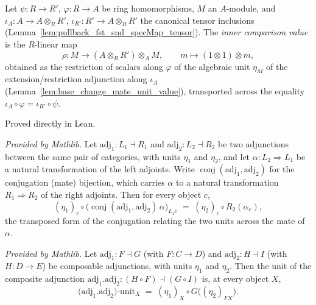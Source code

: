 \begin{definition}

  \label{def:base_change_mate_inner_value}
  Let \(\psi : R \to R'\), \(\varphi : R \to A\) be ring homomorphisms, \(M\) an
  \(A\)-module, and \(\iota_A : A \to A \otimes_R R'\), \(\iota_{R'} : R' \to A \otimes_R R'\)
  the canonical tensor inclusions (Lemma~\ref{lem:pullback_fst_snd_specMap_tensor}).
  The \emph{inner comparison value} is the \(R\)-linear map
  \[
    \rho : M \longrightarrow (A \otimes_R R') \otimes_A M,
    \qquad m \longmapsto (1 \otimes 1) \otimes m,
  \]
  obtained as the restriction of scalars along \(\varphi\) of the algebraic unit
  \(\eta_M\) of the extension/restriction adjunction along \(\iota_A\)
  (Lemma~\ref{lem:base_change_mate_unit_value}), transported across the equality
  \(\iota_A \circ \varphi = \iota_{R'} \circ \psi\).

  Proved directly in Lean.
\end{definition}


\begin{lemma}
  \label{lem:unit_conjugateEquiv_mathlib}
  \mathlibok
  \textit{Provided by Mathlib.}
  Let \(\mathrm{adj}_1 : L_1 \dashv R_1\) and \(\mathrm{adj}_2 : L_2 \dashv R_2\) be two
  adjunctions between the same pair of categories, with units \(\eta_1\) and \(\eta_2\), and let
  \(\alpha : L_2 \Rightarrow L_1\) be a natural transformation of the left adjoints. Write
  \(\operatorname{conj}(\mathrm{adj}_1, \mathrm{adj}_2)\) for the conjugation (mate) bijection,
  which carries \(\alpha\) to a natural transformation \(R_1 \Rightarrow R_2\) of the right
  adjoints. Then for every object \(c\),
  \[
    (\eta_1)_c \circ \bigl(\operatorname{conj}(\mathrm{adj}_1, \mathrm{adj}_2)\,\alpha\bigr)_{L_1 c}
      \;=\; (\eta_2)_c \circ R_2(\alpha_c) ,
  \]
  the transposed form of the conjugation relating the two units across the mate of \(\alpha\).
\end{lemma}

\begin{lemma}
  \label{lem:comp_unit_app_mathlib}
  \mathlibok
  \textit{Provided by Mathlib.}
  Let \(\mathrm{adj}_1 : F \dashv G\) (with \(F : C \to D\)) and \(\mathrm{adj}_2 : H \dashv I\)
  (with \(H : D \to E\)) be composable adjunctions, with units \(\eta_1\) and \(\eta_2\). Then the
  unit of the composite adjunction
  \(\mathrm{adj}_1 . \mathrm{adj}_2 : (H \circ F) \dashv (G \circ I)\) is, at every object \(X\),
  \[
    \bigl(\mathrm{adj}_1 . \mathrm{adj}_2\bigr)\text{-unit}_X
      \;=\; (\eta_1)_X \circ G\bigl((\eta_2)_{F X}\bigr).
  \]
\end{lemma}

